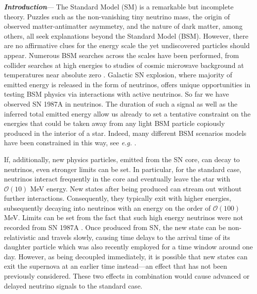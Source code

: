 \textbf{\textit{Introduction}}---
The Standard Model (SM) is a remarkable but incomplete theory. Puzzles such as the non-vanishing tiny neutrino mass, the origin of observed matter-antimatter asymmetry, and the nature of dark matter, among others, all seek explanations beyond the Standard Model (BSM). However, there are no affirmative clues for the energy scale the yet undiscovered particles should appear. Numerous BSM searches across the scales have been performed, from collider searches at high energies \cite{Nath:2010zj} to studies of cosmic microwave background at temperatures near absolute zero \cite{Baumann:2015rya}. Galactic SN explosion, where majority of emitted energy is released in the form of neutrinos, offers unique opportunities in testing BSM physics via interactions with active neutrinos. So far we have observed SN 1987A in neutrinos. The duration of such a signal \cite{Kamiokande-II:1987idp,Bionta:1987qt,Baksan} as well as the inferred total emitted energy \cite{Loredo:2001rx,Pagliaroli:2008ur,Huedepohl2010} allow us already to set a tentative constraint on the energies that could be taken away from any light BSM particle copiously produced in the interior of a star. Indeed, many different BSM scenarios models have been constrained in this way, see \emph{e.g.} \cite{Raffelt:2011nc,Arguelles:2016uwb,Suliga:2020vpz,Lucente:2021hbp,Caputo:2022rca,Caputo:2021rux,PhysRevD.100.083002,DeRocco:2019njg,Kazanas:2014mca,Magill:2018jla}.

If, additionally, new physics particles, emitted from the SN core, can decay to neutrinos, even stronger limits can be set. In particular, for the standard case, neutrinos interact frequently in the core and eventually leave the star with $\mathcal{O}(10)$ MeV energy. New states after being produced can stream out without further interactions. Consequently, they typically exit with higher energies, subsequently decaying into neutrinos with an energy on the order of $\mathcal{O}(100)$ MeV. Limits can be set from the fact that such high energy neutrinos were not recorded from SN 1987A \cite{Kamiokande-II:1987idp,Bionta:1987qt,Baksan, Fiorillo:2022cdq, Brdar:2023tmi}. Once produced from SN, the new state can be non-relativistic and travels slowly, causing time delays to the arrival time of its daughter particle which was also recently employed \cite{Brdar:2023tmi} for a time window around one day. However, as being decoupled immediately, it is possible that new states can exit the supernova at an earlier time instead—an effect that has not been previously considered. These two effects in combination would cause advanced or delayed neutrino signals to the standard case.

